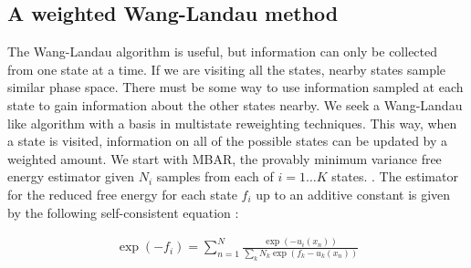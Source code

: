 \documentclass[superscriptaddress,showkeys, nofootinbib, pre, aps]{revtex4-1}
\begin{document}
\subsection{\label{sec:wwl}A weighted Wang-Landau method}

The Wang-Landau algorithm is useful, but information can only be collected from one state at a time.  If we are visiting all the states, nearby states sample similar phase space.  There must be some way to use information sampled at each state to gain information about the other states nearby.  We seek a Wang-Landau like algorithm with a basis in multistate reweighting techniques.  This way, when a state is visited, information on all of the possible states can be updated by a weighted amount.  We start with MBAR, the provably minimum variance free energy estimator given $N_{i}$ samples from each of $i=1 \ldots K$ states. \cite{shirts-chodera:jcp:2008:mbar}.  The estimator for the reduced free energy for each state $f_{i}$ up to an additive constant is given by the following self-consistent equation \cite{shirts-chodera:jcp:2008:mbar}:

\begin{eqnarray}
\exp(-f_i) = \sum_{n=1}^N \frac{\exp(-u_i(x_n))}{\sum_k N_k \exp(f_k-u_k(x_n))}
\label{eq:MBAR}
\end{eqnarray}
\end{document}

